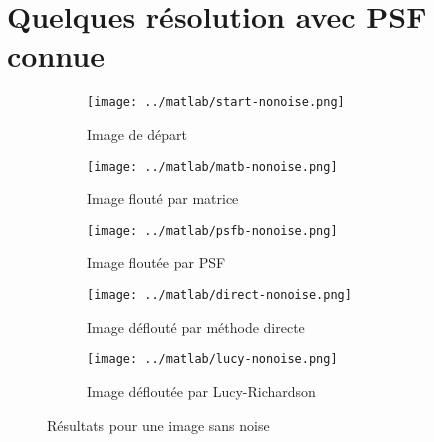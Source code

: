 \documentclass{article}
\begin{document}
\section{Quelques résolution avec PSF connue}

\begin{figure}[!ht]
  \centering
  \begin{subfigure}[b]{0.45\textwidth}
    \texttt{[image: ../matlab/start-nonoise.png]}
    \caption{Image de départ}
    \label{fig:start-nonoise}
  \end{subfigure}
  \begin{subfigure}[b]{0.45\textwidth}
    \texttt{[image: ../matlab/matb-nonoise.png]}
    \caption{Image flouté par matrice}
    \label{fig:matb-nonoise}
  \end{subfigure}%
  \begin{subfigure}[b]{0.45\textwidth}
    \texttt{[image: ../matlab/psfb-nonoise.png]}
    \caption{Image floutée par PSF}
    \label{fig:psfb-nonoise_explicite_lambda}
  \end{subfigure}
  \begin{subfigure}[b]{0.45\textwidth}
    \texttt{[image: ../matlab/direct-nonoise.png]}
    \caption{Image déflouté par méthode directe}
    \label{fig:direct-nonoise}
  \end{subfigure}
  \begin{subfigure}[b]{0.45\textwidth}
    \texttt{[image: ../matlab/lucy-nonoise.png]}
    \caption{Image défloutée par Lucy-Richardson}
    \label{fig:lucy-nonoise}
  \end{subfigure}
  \caption{Résultats pour une image sans noise}
  \label{fig:nonoise}
\end{figure}
\end{document}

